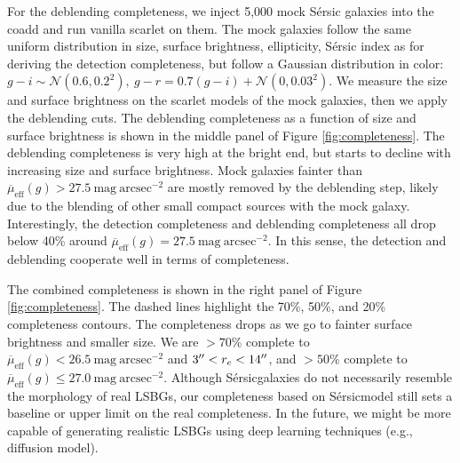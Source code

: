 \documentclass[twocolumn,astrosymb,twocolappendix]{aastex631}
\newcommand{\sbunit}{\mathrm{mag\ arcsec}^{-2}}
\newcommand{\sbeff}{\overline{\mu}_{\mathrm{eff}}(g)}
\newcommand{\sersic}{S\'ersic}
\begin{document}
\begin{CJK*}{UTF8}{gbsn}
For the deblending completeness, we inject 5,000 mock \sersic{} galaxies into the coadd and run vanilla scarlet on them. The mock galaxies follow the same uniform distribution in size, surface brightness, ellipticity, \sersic{} index as for deriving the detection completeness, but follow a Gaussian distribution in color: $g-i \sim \mathcal{N}(0.6, 0.2^2),\ g-r = 0.7 (g-i) + \mathcal{N}(0, 0.03^2)$. We measure the size and surface brightness on the scarlet models of the mock galaxies, then we apply the deblending cuts. The deblending completeness as a function of size and surface brightness is shown in the middle panel of Figure \ref{fig:completeness}. The deblending completeness is very high at the bright end, but starts to decline with increasing size and surface brightness. Mock galaxies fainter than $\sbeff > 27.5\ \sbunit$ are mostly removed by the deblending step, likely due to the blending of other small compact sources with the mock galaxy. Interestingly, the detection completeness and deblending completeness all drop below 40\% around $\sbeff=27.5\ \sbunit$. In this sense, the detection and deblending cooperate well in terms of completeness. 

The combined completeness is shown in the right panel of Figure \ref{fig:completeness}. The dashed lines highlight the 70\%, 50\%, and 20\% completeness contours. The completeness drops as we go to fainter surface brightness and smaller size. We are $>70\%$ complete to $\sbeff < 26.5\ \sbunit$ and $3\mbox{$^{\prime\prime}$} < r_e < 14\mbox{$^{\prime\prime}$}$, and $>50\%$ complete to $\sbeff \leqslant 27.0\ \sbunit$. Although \sersic galaxies do not necessarily resemble the morphology of real LSBGs, our completeness based on \sersic model still sets a baseline or upper limit on the real completeness. In the future, we might be more capable of generating realistic LSBGs using deep learning techniques (e.g., diffusion model). 



\end{CJK*}
\end{document}
